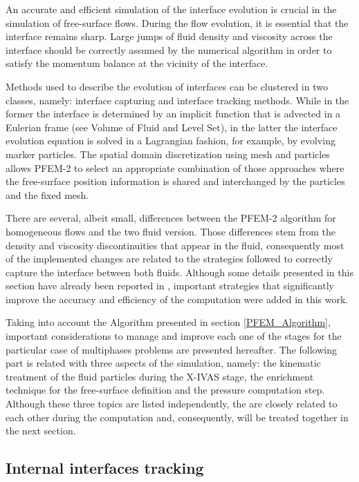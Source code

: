 An accurate and efficient simulation of the interface evolution is crucial in the simulation of free-surface flows. During the flow evolution, it is essential that the interface remains sharp. Large jumps of fluid density and viscosity across the interface should be correctly assumed by the numerical algorithm in order to satisfy the momentum balance at the vicinity of the interface.

Methods used to describe the evolution of interfaces can be clustered in two classes, namely: interface capturing and interface tracking methods. While in the former the interface is determined by an implicit function that is advected in a Eulerian frame (see Volume of Fluid \cite{VoF} and Level Set\cite{Osher01}), in the latter the interface evolution equation is solved in a Lagrangian fashion, for example, by evolving marker particles. The spatial domain discretization using mesh and particles allows PFEM-2 to select an appropriate combination of those approaches where the free-surface position information is shared and interchanged by the particles and the fixed mesh.

There are several, albeit small, differences between the PFEM-2 algorithm for homogeneous flows and the two fluid version. Those differences stem from the density and viscosity discontinuities that appear in the fluid, consequently most of the implemented changes are related to the strategies followed to correctly capture the interface between both fluids. Although some details presented in this section have already been reported in \cite{Idelsohn13c}, important strategies that significantly improve the accuracy and efficiency of the computation were added in this work.

Taking into account the Algorithm presented in section \ref{PFEM_Algorithm}, important considerations to manage and improve each one of the stages for the particular case of multiphases problems are presented hereafter. The following part is related with three aspects of the simulation, namely: the kinematic treatment of the fluid particles during the X-IVAS stage, the enrichment technique for the free-surface definition and the pressure computation step. Although these three topics are listed independently, the are closely related to each other during the computation and, consequently, will be treated together in the next section.

\subsection{Internal interfaces tracking}\label{sec:tracking}

